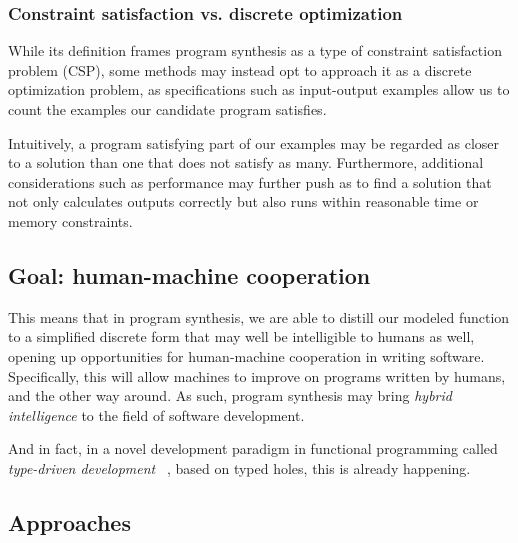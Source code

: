\documentclass{article}
\begin{document}
\subsubsection{Constraint satisfaction vs. discrete optimization}

While its definition frames program synthesis as a type of constraint satisfaction problem (CSP),
some methods may instead opt to approach it as a discrete optimization problem,
as specifications such as input-output examples allow us to count the examples our candidate program satisfies.

Intuitively, a program satisfying part of our examples may be regarded as closer to a solution than one that does not satisfy as many.
Furthermore, additional considerations such as performance may further push as to find a solution that not only calculates outputs correctly but also runs within reasonable time or memory constraints.

\subsection{Goal: human-machine cooperation}

This means that in program synthesis, we are able to distill our modeled function
to a simplified discrete form that may well be intelligible to humans as well,
opening up opportunities for human-machine cooperation in writing software.
Specifically, this will allow machines to improve on programs written by humans, and the other way around.
As such, program synthesis may bring \emph{hybrid intelligence} to the field of software development.

And in fact, in a novel development paradigm in functional programming called \emph{type-driven development}%
~\citep{brady2017type}, based on typed holes, this is already happening.

\subsection{Approaches}
\end{document}
